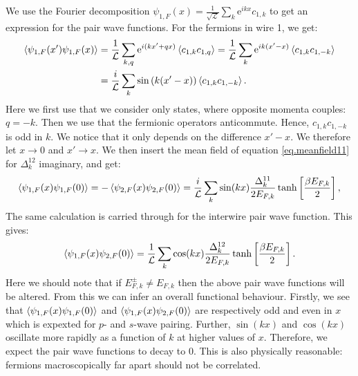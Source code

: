 We use the Fourier decomposition $\psi_{1,F}(x) = \frac{1}{\sqrt{\mathcal{L}}} \sum_k \text{e}^{ikx} c_{1,k}$ to get an expression for the pair wave functions. For the fermions in wire 1, we get:
\begin{align}
\braket{\psi_{1,F}(x')\psi_{1,F}(x)} 
&= \frac{1}{\mathcal{L}} \sum_{k,q} \text{e}^{i(kx' + qx)}\braket{c_{1,k}c_{1,q}} = \frac{1}{\mathcal{L}} \sum_{k} \text{e}^{ik(x' - x)}\braket{c_{1,k}c_{1,-k}} \nonumber \\
&= \frac{i}{\mathcal{L}} \sum_{k} \sin\left(k(x' - x)\right)\braket{c_{1,k}c_{1,-k}}. \nonumber 
\end{align}
Here we first use that we consider only states, where opposite momenta couples: $q = -k$. Then we use that the fermionic operators anticommute. Hence, $c_{1,k}c_{1,-k}$ is odd in $k$. We notice that it only depends on the difference $x' - x$. We therefore let $x \to 0$ and $x' \to x$. We then insert the mean field of equation \eqref{eq.meanfield11} for $\Delta^{12}_k$ imaginary, and get:
\begin{equation}
\braket{\psi_{1,F}(x)\psi_{1,F}(0)} = - \braket{\psi_{2,F}(x)\psi_{2,F}(0)} = \frac{i}{\mathcal{L}}\sum_k \sin(kx) \frac{\Delta^{11}_k}{2E_{F,k}}\tanh\left[\frac{ \beta E_{F,k} }{2}\right], 
\label{eq.intrawirepairwavefunction}
\end{equation}
The same calculation is carried through for the interwire pair wave function. This gives:
\begin{equation}
\braket{\psi_{1,F}(x)\psi_{2,F}(0)} = \frac{1}{\mathcal{L}}\sum_k \cos(kx) \frac{\Delta^{12}_k}{2E_{F,k}}\tanh\left[\frac{ \beta E_{F,k} }{2}\right].
\label{eq.interwirepairwavefunction}
\end{equation} 
Here we should note that if $E^\pm_{F,k} \neq E_{F,k}$ then the above pair wave functions will be altered. From this we can infer an overall functional behaviour. Firstly, we see that $\braket{\psi_{1,F}(x)\psi_{1,F}(0)}$ and $\braket{\psi_{1,F}(x)\psi_{2,F}(0)}$ are respectively odd and even in $x$ which is expexted for $p$- and $s$-wave pairing. Further, $\sin(kx)$ and $\cos(kx)$ oscillate more rapidly as a function of $k$ at higher values of $x$. Therefore, we expect the pair wave functions to decay to 0. This is also physically reasonable: fermions macroscopically far apart should not be correlated. 

